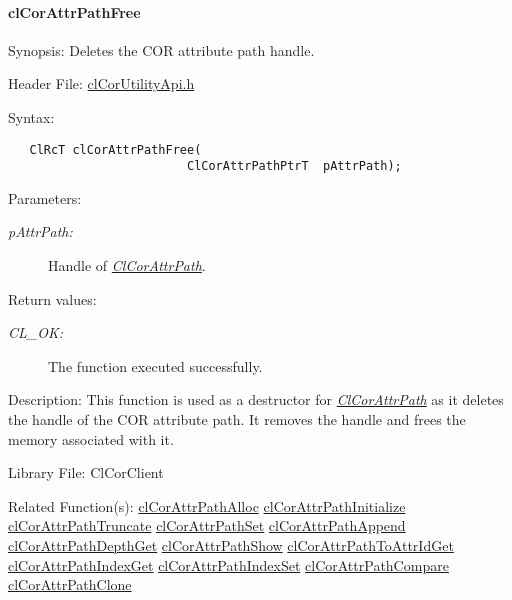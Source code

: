 \hypertarget{pagecor257}{}\paragraph{cl\-Cor\-Attr\-Path\-Free}\label{pagecor257}
\begin{Desc}
\item[Synopsis:]Deletes the COR attribute path handle.\end{Desc}
\begin{Desc}
\item[Header File:]\hyperlink{cl_cor_utility_api_8h}{cl\-Cor\-Utility\-Api.h}\end{Desc}
\begin{Desc}
\item[Syntax:]

\footnotesize\begin{verbatim}   ClRcT clCorAttrPathFree(
                         ClCorAttrPathPtrT  pAttrPath);
\end{verbatim}
\normalsize
\end{Desc}
\begin{Desc}
\item[Parameters:]
\begin{description}
\item[{\em p\-Attr\-Path:}]Handle of {\em \hyperlink{struct_cl_cor_attr_path}{Cl\-Cor\-Attr\-Path}\/}.\end{description}
\end{Desc}
\begin{Desc}
\item[Return values:]
\begin{description}
\item[{\em CL\_\-OK:}]The function executed successfully.\end{description}
\end{Desc}
\begin{Desc}
\item[Description:]This function is used as a destructor for {\em \hyperlink{struct_cl_cor_attr_path}{Cl\-Cor\-Attr\-Path}\/} as it deletes the handle of the COR attribute path. It removes the handle and frees the memory associated with it.\end{Desc}
\begin{Desc}
\item[Library File:]Cl\-Cor\-Client\end{Desc}
\begin{Desc}
\item[Related Function(s):]\hyperlink{group__group13}{cl\-Cor\-Attr\-Path\-Alloc} \hyperlink{group__group13}{cl\-Cor\-Attr\-Path\-Initialize} \hyperlink{group__group13}{cl\-Cor\-Attr\-Path\-Truncate} \hyperlink{group__group13}{cl\-Cor\-Attr\-Path\-Set} \hyperlink{group__group13}{cl\-Cor\-Attr\-Path\-Append} \hyperlink{group__group13}{cl\-Cor\-Attr\-Path\-Depth\-Get} \hyperlink{group__group13}{cl\-Cor\-Attr\-Path\-Show} \hyperlink{group__group13}{cl\-Cor\-Attr\-Path\-To\-Attr\-Id\-Get} \hyperlink{group__group13}{cl\-Cor\-Attr\-Path\-Index\-Get} \hyperlink{group__group13}{cl\-Cor\-Attr\-Path\-Index\-Set} \hyperlink{group__group13}{cl\-Cor\-Attr\-Path\-Compare} \hyperlink{group__group13}{cl\-Cor\-Attr\-Path\-Clone} \end{Desc}

